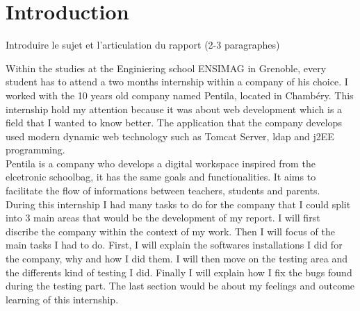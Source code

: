 
\section*{Introduction}
Introduire le sujet et l’articulation du rapport (2-3 paragraphes)

Within the studies at the Enginiering school ENSIMAG in Grenoble, every student has
to attend a two months internship within a company of his choice.
I worked with the 10 years old company named Pentila, located in Chambéry. 
This internship hold my attention because it was about web development which is a field 
that I wanted to know better. The application that the company develops used modern
dynamic web technology such as Tomcat Server, ldap and j2EE programming. \\  


Pentila is a company who develops a digital workspace inspired from the elcetronic schoolbag, it has
the same goals and functionalities. It aims to facilitate the flow of informations between 
teachers, students and parents. \\

During this internship I had many tasks to do for the company that I could split into 3 main
areas that would be the development of my report.  
I will first discribe the company within the context of my work.
Then I will focus of the main tasks I had to do. First, I will explain the softwares 
installations I did for the company, why and how I did them. I will then move on the testing
area and the differents kind of testing I did. Finally I will explain how I fix the bugs 
found during the testing part. The last section would be about my feelings and outcome
learning of this internship.  
